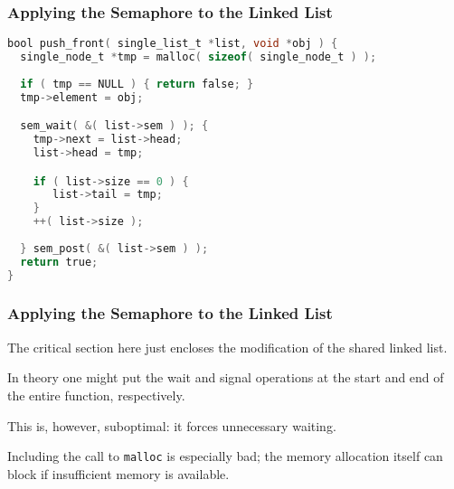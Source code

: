 \begin{frame}[fragile]
	\frametitle{Applying the Semaphore to the Linked List}

	\begin{lstlisting}[language=C]
bool push_front( single_list_t *list, void *obj ) {
  single_node_t *tmp = malloc( sizeof( single_node_t ) );
  
  if ( tmp == NULL ) { return false; }  
  tmp->element = obj;

  sem_wait( &( list->sem ) ); {  
    tmp->next = list->head;
    list->head = tmp;

    if ( list->size == 0 ) {
       list->tail = tmp;
    }
    ++( list->size );
  
  } sem_post( &( list->sem ) );
  return true;
}
	\end{lstlisting}
\end{frame}

\begin{frame}
	\frametitle{Applying the Semaphore to the Linked List}

	The critical section here just encloses the modification of the shared linked list.

	In theory one might put the wait and signal operations at the start and end of the entire function, respectively.

	This is, however, suboptimal: it forces unnecessary waiting.

	Including the call to \texttt{malloc} is especially bad; the memory allocation itself can block if insufficient memory is available.

\end{frame}



